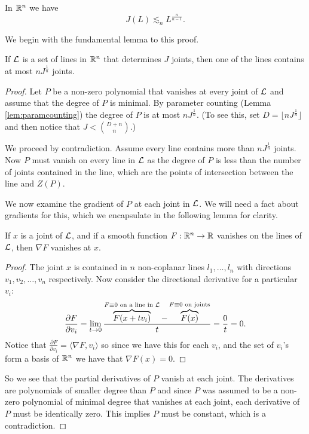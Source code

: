 \begin{theorem}
    In $\mathbb R^n$ we have
      $$J(L) \lesssim_n L^{\frac{n}{n-1}}.$$
\end{theorem}
We begin with the fundamental lemma to this proof. 
\begin{lemma}
    If $\mathcal L$ is a set of lines in $\mathbb R^n$ that determines $J$ joints, then one of the lines contains at most $nJ^{\frac{1}{n}}$ joints.
\label{joints_bound}
\end{lemma}
\begin{proof}
Let $P$ be a non-zero polynomial that vanishes at every joint of $\mathcal L$ and assume that the degree of $P$ is minimal. By parameter counting (Lemma \ref{lem:paramcounting}) the degree of $P$ is at most 
$nJ^{\frac{1}{n}}$. (To see this, set $D = \lfloor nJ^{\frac{1}{n}}\rfloor$ and then notice that $J < {{D+n}\choose {n}}$.)

We proceed by contradiction. Assume every line contains more than $nJ^{\frac{1}{n}}$ joints.
 Now $P$ must vanish on every line in $\mathcal L$ as the degree of $P$ is less than the number of joints contained in the line, which are the points of intersection between the line and $Z(P)$. 

We now examine the gradient of $P$ at each joint in $\mathcal L$. We will need a fact about gradients for this, which we encapsulate in the following lemma for clarity.
\begin{lemma}
    If $x$ is a joint of $\mathcal L$, and if a smooth function $F: \mathbb R^n \to \mathbb R$ vanishes on the lines of $\mathcal L$, then $\nabla F$ vanishes at $x$. 
\end{lemma}
\begin{proof}
    The joint $x$ is contained in $n$ non-coplanar lines $l_1, \dots, l_n$ with directions $v_1, v_2, \dots , v_n$ respectively. 
    Now consider the directional derivative for a particular $v_i$:
    \[
    \frac{\partial F}{\partial v_i} = \lim_{t \to 0} \frac{ \overbrace{F(x+ tv_i)}^{F \equiv 0 \text{ on a line in $\mathcal L$}} - \overbrace{F(x)}^{F \equiv 0 \text{ on joints}}}{t} = \frac{0}{t} = 0.    
    \]
    Notice that $ \frac{\partial F}{\partial v_i} = \langle \nabla F, v_i\rangle$ so since we have this for each $v_i$, and the set of $v_i$'s form a basis of $\mathbb R^n$ we have that $\nabla F(x) = 0$.
\end{proof}
So we see that the partial derivatives of $P$ vanish at each joint. The derivatives are polynomials of
smaller degree than $P$ and since $P$ was assumed to be a non-zero polynomial of minimal degree that
vanishes at each joint, each derivative of $P$ must be identically zero. This implies $P$ must be
constant, which is 
a contradiction.
\end{proof}
